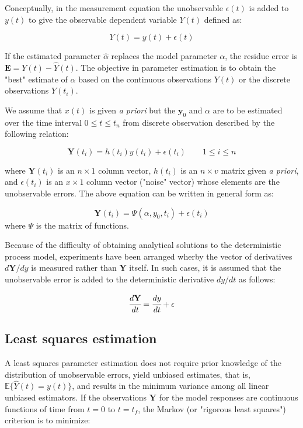 \documentclass[a4paper,fleqn]{cas-dc}
\begin{document}
Conceptually, in the measurement equation the unobservable $\epsilon(t)$ is added to $y(t)$ to give the observable dependent variable $Y(t)$ defined as:

\begin{equation}
	Y(t) = y(t) + \epsilon(t)
\end{equation}

If the estimated parameter $\hat{\alpha}$ replaces the model parameter $\alpha$, the residue error is $\textbf{E} = Y(t) - \hat{Y}(t)$. The objective in parameter estimation is to obtain the "best" estimate of $\alpha$ based on the continuous observations $Y(t)$ or the discrete observations $Y(t_i)$. 

We assume that $x(t)$ is given \textit{a priori} but the $\textbf{y}_0$ and $\alpha$ are to be estimated over the time interval $0 \leq t \leq t_n$ from discrete observation described by the following relation:

\begin{equation}
	\textbf{Y}(t_i) = h(t_i)y(t_i) + \epsilon(t_i) \qquad 1 \leq i \leq n
\end{equation}

where $\textbf{Y}(t_i)$ is an $n \times 1$ column vector, $h(t_i)$ is an $n \times v$ matrix given \textit{a priori}, and $\epsilon (t_i)$ is an $x \times 1$ column vector ("noise" vector) whose elements are the unobservable errors. The above equation can be written in general form as:

\begin{equation} \label{EQ: Measurment_noise}
	\textbf{Y}(t_i) = \Psi(\alpha, y_0, t_i) + \epsilon(t_i)
\end{equation}
where $\Psi$ is the matrix of functions.

Because of the difficulty of obtaining analytical solutions to the deterministic process model, experiments have been arranged wherby the vector of derivatives $d\textbf{Y}/dy$ is measured rather than \textbf{Y} itself. In such cases, it is assumed that the unobservable error is added to the deterministic derivative $dy/dt$ as follows:

\begin{equation}
	\cfrac{d\textbf{Y}}{dt} = \cfrac{dy}{dt} + \epsilon
\end{equation}

\subsection{Least squares estimation}
A least squares parameter estimation does not require prior knowledge of the distribution of unobservable errors, yield  unbiased estimates, that is, $ \mathbb{E}\{\hat{Y}(t) = y(t) \} $, and results in the minimum variance among all linear unbiased estimators. If the observations $\textbf{Y}$ for the model responses are continuous functions of time from $t = 0$ to $t = t_f$, the Markov (or "rigorous least squares") criterion is to minimize:
\end{document}
